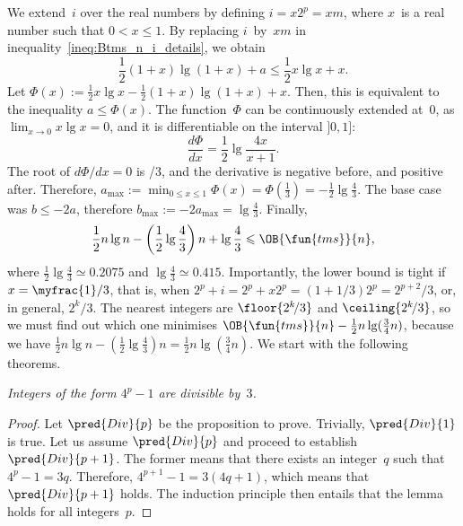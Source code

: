 We extend~\(i\) over the real numbers by defining \(i=x2^p=xm\), where
\(x\)~is a real number such that \(0 < x \leqslant 1\). By replacing
\(i\)~by~\(xm\) in inequality~\eqref{ineq:Btms_n_i_details}, we obtain
\begin{equation*}
\frac{1}{2}(1+x)\lg(1+x) + a \leqslant \frac{1}{2}x\lg x + x.
\end{equation*}
Let \(\Phi(x) := \tfrac{1}{2}x\lg x - \tfrac{1}{2}(1+x)\lg(1+x) +
x\). Then, this is equivalent to the inequality \(a \leqslant
\Phi(x)\). The function~\(\Phi\) can be continuously extended
at~\(0\), as \(\lim_{x \to 0} x\lg x = 0\), and it is differentiable
on the interval \(]0,1]\):
\begin{equation}
\frac{d\Phi}{dx} = \frac{1}{2}\lg\frac{4x}{x+1}.
\label{eq:der_Phi}
\end{equation}
The root of \(d\Phi/dx = 0\) is /{3}, and the derivative
is negative before, and positive after. Therefore, \(a_{\max} :=
\min_{0 \leqslant x \leqslant 1}\Phi(x) = \Phi(\tfrac{1}{3}) =
-\tfrac{1}{2}\lg\tfrac{4}{3}\). The base case was \(b \leqslant -2a\),
therefore \(b_{\max} := -2a_{\max} = \lg\tfrac{4}{3}\). Finally,
\begin{equation}
  \frac{1}{2}n\lg n - \left(\frac{1}{2}\lg\frac{4}{3}\right)n + \lg\frac{4}{3}
  \leqslant \OB{\fun{tms}}{n},
\label{ineq:lower_Btms}
\end{equation}
where \(\tfrac{1}{2}\lg\tfrac{4}{3} \simeq 0.2075\) and
\(\lg\tfrac{4}{3} \simeq 0.415\). Importantly, the lower bound is
tight if \(x=\myfrac{1}/{3}\), that is, when
\(2^p+i=2^p+x2^p=(1+1/3)2^p=2^{p+2}\!/3\), or, in general,
\(2^k\!/3\). The nearest integers are \(\floor{2^k\!/3}\) and
\(\ceiling{2^k\!/3}\), so we must find out which one minimises
\(\OB{\fun{tms}}{n} - \tfrac{1}{2}n\lg(\tfrac{3}{4}n)\), because we
have \(\tfrac{1}{2}n\lg n - \left(\tfrac{1}{2}\lg\tfrac{4}{3}\right)n
= \tfrac{1}{2}n\lg(\tfrac{3}{4}n)\). We start with the following
theorems.
\begin{lemma}
\label{lem:div3}
\textsl{Integers of the form \(4^p-1\) are divisible by~\(3\).}
\end{lemma}
\begin{proof}
  Let \(\pred{Div}{p}\) be the proposition
  to prove. Trivially, \(\pred{Div}{1}\) is true. Let us assume
  \(\pred{Div}{p}\) and proceed to establish \(\pred{Div}{p+1}\). The
  former means that there exists an integer~\(q\) such that \(4^p - 1
  = 3q\). Therefore, \(4^{p+1} - 1 = 3(4q+1)\), which means that
  \(\pred{Div}{p+1}\) holds. The induction principle then entails that
  the lemma holds for all integers~\(p\).
\end{proof}
